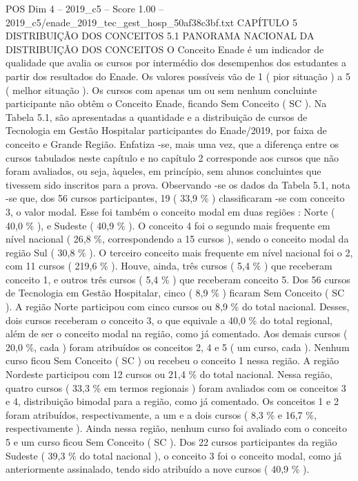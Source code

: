 \begin{textsample}{POS Dim 4 – 2019\_c5 – Score 1.00 – 2019\_c5/enade\_2019\_tec\_gest\_hosp\_50af38c3bf.txt}  \label{ex:f4_pos_196}
CAPÍTULO 5 DISTRIBUIÇÃO DOS CONCEITOS 5.1 PANORAMA NACIONAL DA DISTRIBUIÇÃO DOS CONCEITOS O Conceito Enade é um indicador de qualidade que avalia os cursos por intermédio dos desempenhos dos estudantes a partir dos resultados do Enade.
Os valores possíveis vão de 1 ( pior situação ) a 5 ( melhor situação ).
Os cursos com apenas um ou sem nenhum concluinte participante não obtêm o Conceito Enade, ficando Sem Conceito ( SC ).
Na Tabela 5.1, são apresentadas a quantidade e a distribuição de cursos de Tecnologia em Gestão Hospitalar participantes do Enade/2019, por faixa de conceito e Grande Região.
Enfatiza -se, mais uma vez, que a diferença entre os cursos tabulados neste capítulo e no capítulo 2 corresponde aos cursos que não foram avaliados, ou seja, àqueles, em princípio, sem alunos concluintes que tivessem sido inscritos para a prova.
Observando -se os dados da Tabela 5.1, nota -se que, dos 56 cursos participantes, 19 ( 33,9 \% ) classificaram -se com conceito 3, o valor modal.
Esse foi também o conceito modal em duas regiões : Norte ( 40,0 \% ), e Sudeste ( 40,9 \% ).
O conceito 4 foi o segundo mais frequente em nível nacional ( 26,8 \%, correspondendo a 15 cursos ), sendo o conceito modal da região Sul ( 30,8 \% ).
O terceiro conceito mais frequente em nível nacional foi o 2, com 11 cursos ( 219,6 \% ).
Houve, ainda, três cursos ( 5,4 \% ) que receberam conceito 1, e outros três cursos ( 5,4 \% ) que receberam conceito 5.
Dos 56 cursos de Tecnologia em Gestão Hospitalar, cinco ( 8,9 \% ) ficaram Sem Conceito ( SC ).
A região Norte participou com cinco cursos ou 8,9 \% do total nacional.
Desses, dois cursos receberam o conceito 3, o que equivale a 40,0 \% do total regional, além de ser o conceito modal na região, como já comentado.
Aos demais cursos ( 20,0 \%, cada ) foram atribuídos os conceitos 2, 4 e 5 ( um curso, cada ).
Nenhum curso ficou Sem Conceito ( SC ) ou recebeu o conceito 1 nessa região.
A região Nordeste participou com 12 cursos ou 21,4 \% do total nacional.
Nessa região, quatro cursos ( 33,3 \% em termos regionais ) foram avaliados com os conceitos 3 e 4, distribuição bimodal para a região, como já comentado.
Os conceitos 1 e 2 foram atribuídos, respectivamente, a um e a dois cursos ( 8,3 \% e 16,7 \%, respectivamente ).
Ainda nessa região, nenhum curso foi avaliado com o conceito 5 e um curso ficou Sem Conceito ( SC ).
Dos 22 cursos participantes da região Sudeste ( 39,3 \% do total nacional ), o conceito 3 foi o conceito modal, como já anteriormente assinalado, tendo sido atribuído a nove cursos ( 40,9 \% ).

\end{textsample}
